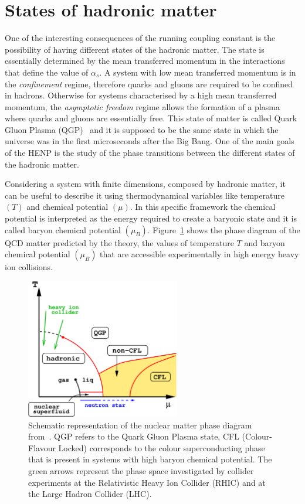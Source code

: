 %
%
\section{States of hadronic matter}
\label{sec:1.2}

One of the interesting consequences of the running coupling constant is the possibility of having
different states of the hadronic matter. The state is essentially determined by the mean transferred 
momentum in the interactions that define the value of $\alpha_{s}$. 
A system with low mean transferred momentum is in the \textit{confinement} regime, therefore quarks
and gluons are required to be confined in hadrons. Otherwise for systems characterised by a high mean
transferred momentum, the \textit{asymptotic freedom} regime allows the formation of a plasma where
quarks and gluons are essentially free.
This state of matter is called Quark Gluon Plasma (QGP)~\cite{firstQGP} and it is supposed to be the same state in
which the universe was in the first microseconds after the Big Bang.
One of the main goals of the HENP is the study of the phase transitions between the different
states of the hadronic matter.

Considering a system with finite dimensions, composed by hadronic matter, it can be useful to describe it 
using thermodynamical variables like temperature $(T)$ and chemical potential $(\mu)$. In this
specific framework the chemical potential is interpreted as the energy required to create a 
baryonic state and it is called baryon chemical potential $(\mu_{B})$. 
Figure~\ref{fig:qgpdiagram} shows the phase diagram of the QCD matter predicted by the theory, 
the values of temperature $T$ and baryon chemical potential $(\mu_{B})$ that are accessible
experimentally in high energy heavy ion collisions.

\begin{figure}
    \centering
    \includegraphics[width=0.6\textwidth]{gfx/qgpphase}
	\caption{Schematic representation of the nuclear matter phase diagram from~\cite{qgpphase}. QGP refers to the Quark Gluon Plasma state, CFL (Colour-Flavour Locked) corresponds to the colour superconducting phase that is present in systems with high baryon chemical potential. The green arrows represent the phase space investigated by collider experiments at the Relativistic Heavy Ion Collider (RHIC) and at the Large Hadron Collider (LHC).}
	\label{fig:qgpdiagram}
\end{figure}

